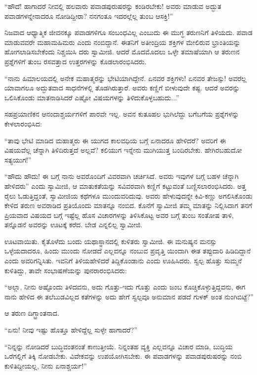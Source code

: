 “ಹೌದೆ! ಹಾಗಾದರೆ ನೀವಲ್ಲಿ ಹಲವಾರು ಪವಾಡಪುರುಷರನ್ನು ಕಂಡಿರಬೇಕು! ಅವರು ಮಾಡುವ ಅದ್ಭುತ ಪವಾಡಗಳನ್ನೇನಾದರೂ ನೋಡಿದ್ದೀರಾ? ನನಗಂತೂ ಇದರಲ್ಲೆಲ್ಲ ತುಂಬ ಆಸಕ್ತಿ!”

ನಿಜವಾದ ಆಧ್ಯಾತ್ಮಿಕ ಜೀವನಕ್ಕೂ ಪವಾಡಗಳಿಗೂ ಸಂಬಂಧವಿಲ್ಲ ಎಂಬುದು ಈ ಮುಗ್ಧ ತರುಣನಿಗೆ ತಿಳಿಯದು. ಪವಾಡ ಮಾಡುವವರೇ ಮಹಾಮಹಿಮರು ಎಂದು ನಂಬಿದ್ದಾನೆ. ಈತನಿಗೆ ಅತೀಂದ್ರಿಯ ಶಕ್ತಿಗಳ ಮೇಲಿರುವ ಭ್ರಾಂತಿಯನ್ನು ಹೋಗಲಾಡಿಸಬೇಕೆಂದು ನಿಶ್ಚಯಿಸಿ ದರು ಸ್ವಾಮೀಜಿ. ಆದರೆ ಮೊದಮೊದಲು ಒಳ್ಳೇ ತಮಾಷೆಯಾಗಿ ಆ ತರುಣನ ಪ್ರಶ್ನೆಗಳಿಗೆ ತುಂಬ ರಸವತ್ತಾದ ಉತ್ತರಗಳನ್ನು ಕೊಡಲಾರಂಭಿಸಿದರು.

“ನಾನು ಹಿಮಾಲಯದಲ್ಲಿ ಅನೇಕ ಮಹಾತ್ಮರನ್ನು ಭೇಟಿಯಾಗಿದ್ದೇನೆ. ಏನವರ ಶಕ್ತಿಗಳು! ಏನವರ ತೇಜಸ್ಸು! ಅವರೆಲ್ಲ ಯಾವಾಗಲೂ ಅದ್ಭುತವಾದ ಸಾಧನೆಗಳಲ್ಲಿ ತೊಡಗಿರುತ್ತಾರೆ. ಅವರು ಕಣ್ಣಿಗೆ ಬೀಳುವುದೇ ಕಷ್ಟ. ಆದರೆ ಅವರನ್ನು ಒಲಿಸಿಕೊಂಡು ಮಾತನಾಡಿಸಿದರೆ ಎಷ್ಟೋ ವಿಷಯಗಳನ್ನು ತಿಳಿದುಕೊಳ್ಳಬಹುದು...”

ಸಹಪ್ರಯಾಣಿಕನ ಆನಂದಾಶ್ಚರ್ಯಗಳಿಗೆ ಪಾರವೇ ಇಲ್ಲ. ಅವನ ಕುತೂಹಲ ಭುಗಿಲೆದ್ದು ಬಗೆಬಗೆಯ ಪ್ರಶ್ನೆಗಳನ್ನು ಕೇಳಲಾರಂಭಿಸಿದ:

“ತಾವು ಭೇಟಿ ಮಾಡಿದ ಮಹಾತ್ಮರು ಈ ಯುಗದ ಕಾಲವಧಿಯ ಬಗ್ಗೆ ಏನಾದರೂ ಹೇಳಿದರೆ? ಅವರಿಗೆ ಈ ವಿಷಯವೆಲ್ಲ ಚೆನ್ನಾಗಿ ತಿಳಿದಿರುತ್ತದೆ ಅಲ್ಲವೆ? ಕಲಿಯುಗ ಇನ್ನೇನು ಮುಗಿಯುತ್ತ ಬಂದಿರಬೇಕು. ಹೇಗಿರಬಹುದೋ ಸತ್ಯಯುಗ!”

“ಹೌದು ಹೌದು! ಈ ಬಗ್ಗೆ ನಾನು ಅವರೊಂದಿಗೆ ವಿವರವಾಗಿ ಚರ್ಚಿಸಿದೆ. ಅವರು ಇವುಗಳ ಬಗ್ಗೆ ಬಹಳ ಚೆನ್ನಾಗಿ ಹೇಳಿದರು” ಎಂದು ಸ್ವಾಮೀಜಿ, ಆ ಮಾತುಕತೆಯನ್ನು ಸವಿವರವಾಗಿ ಕಣ್ಣಿಗೆ ಕಟ್ಟುವಂತೆ ಬಣ್ಣಿಸಲಾರಂಭಿಸಿದರು. ಅತ್ತ ರೈಲು ಓಡುತ್ತಿದ್ದಂತೆ, ಸ್ವಾಮೀಜಿಯ ಕಥೆಗಳೂ ಮುಂದುವರಿದುವು. ಅವರು ಹೇಳುವುದನ್ನೇ ಕಿವಿ-ಕಣ್ಣು ಅಗಲಿಸಿಕೊಂಡು ಕೇಳಿದ ತರುಣ ಅವರಾಡಿದ ಪ್ರತಿಯೊಂದು ಮಾತನ್ನೂ ನಂಬಿದ. ಕೊನೆಗೆ ಸ್ವಾಮೀಜಿ ತಮ್ಮ ಮಾತನ್ನು ನಿಲ್ಲಿಸಿದಾಗ ತನಗೆ ಪ್ರಿಯವಾದ ವಿಷಯದ ಬಗ್ಗೆ ಇಷ್ಟೆಲ್ಲ ಹೊಸ ವಿಚಾರಗಳನ್ನು ತಿಳಿಸಿಕೊಟ್ಟ ಅವರ ಬಗ್ಗೆ ತುಂಬ ಸಂತೋಷ ತಾಳಿ, ತನ್ನೊಡನೆ ಅವರನ್ನು ಊಟಕ್ಕೆ ಕರೆದ. ಬೇಡ ಎನ್ನಲಿಲ್ಲ ಸ್ವಾಮೀಜಿ.

ಊಟವಾಯಿತು. ಕೈತೊಳೆದು ಬಂದು ಯಥಾಸ್ಥಾನದಲ್ಲಿ ಕುಳಿತರು ಸ್ವಾಮೀಜಿ. ಈ ಮನುಷ್ಯನ ಮನಸ್ಸು ಒಳ್ಳೆಯದಾದರೂ, ಹಿಂದು ಮುಂದು ನೋಡದೆ ಎಲ್ಲವನ್ನೂ ನಂಬುವ ಪ್ರವೃತ್ತಿ ಯಿಂದಾಗಿ ಈತ ತಪ್ಪುದಾರಿ ಹಿಡಿದಿದ್ದಾನೆ ಎಂದು ಅವರಿಗನ್ನಿಸಿತು. ಇವನಿಗೆ ತಿಳಿಯಹೇಳಿದರೆ ತಿದ್ದಿಕೊಂಡಾನು ಎಂದು ಊಹಿಸಿದರು. ಸ್ವಲ್ಪ ಹೊತ್ತು ಸುಮ್ಮನೆ ಕುಳಿತಿದ್ದು, ತಾವೇ ಸಂಭಾಷಣೆಯನ್ನು ಪುನರಾರಂಭಿಸಿದರು:

“ಅಲ್ಲಾ, ನೀನು ಅಷ್ಟೊಂದು ತಿಳಿದವನು, ಅದು ಗೊತ್ತು-ಇದು ಗೊತ್ತು ಎಂದು ಜಂಬ ಕೊಚ್ಚಿಕೊಳ್ಳುತ್ತಿದ್ದವನು, ಈಗ ನಾನು ಹೇಳಿದ ಈ ತಲೆಬುಡವಿಲ್ಲದ ಕತೆಗಳನ್ನು ಅದು ಹೇಗೆ ಸ್ವಲ್ಪವೂ ಅನುಮಾನ ಪಡದೆ ಗುಳಕ್ ಅಂತ ನುಂಗಿಬಿಟ್ಟೆ?”

ಆ ತರುಣ ದಿಗ್ಭ್ರಾಂತನಾದ.

“ಏನು! ನೀವು ಇಷ್ಟು ಹೊತ್ತೂ ಹೇಳಿದ್ದೆಲ್ಲ ಸುಳ್ಳೇ ಹಾಗಾದರೆ?”

“ನಿನ್ನನ್ನು ನೋಡಿದರೆ ಬುದ್ಧಿವಂತನಂತೆ ಕಾಣುತ್ತೀಯೆ. ನಿನ್ನಂತಹ ವ್ಯಕ್ತಿ ಎಲ್ಲವನ್ನೂ ವಿಚಾರ ಮಾಡಿ, ಬುದ್ಧಿಯ ಒರೆಗಲ್ಲಿಗೆ ತಿಕ್ಕಿ ನೋಡಬೇಕು. ವಿವೇಕವನ್ನು ಉಪಯೋಗಿಸಬೇಕು. ಈ ಪವಾಡಗಳನ್ನು ಪವಾಡಪುರುಷರನ್ನು ನಂಬಿ ಕುಳಿತಿದ್ದೀಯಲ್ಲ, ನೀನು ಏನಾಶ್ಚರ್ಯ!”

